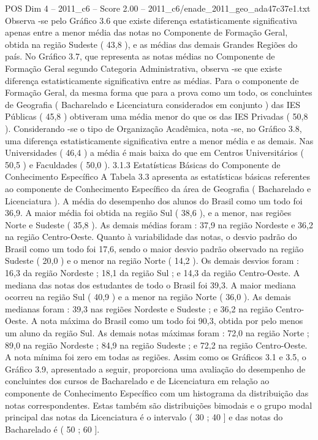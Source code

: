 \begin{textsample}{POS Dim 4 – 2011\_c6 – Score 2.00 – 2011\_c6/enade\_2011\_geo\_ada47c37e1.txt}
Observa -se pelo Gráfico 3.6 que existe diferença estatisticamente significativa apenas entre a menor média das notas no Componente de Formação Geral, obtida na região Sudeste ( 43,8 ), e as médias das demais Grandes Regiões do país.
No Gráfico 3.7, que representa as notas médias no Componente de Formação Geral segundo Categoria Administrativa, observa -se que existe diferença estatisticamente significativa entre as médias.
Para o componente de Formação Geral, da mesma forma que para a prova como um todo, os concluintes de Geografia ( Bacharelado e Licenciatura considerados em conjunto ) das IES Públicas ( 45,8 ) obtiveram uma média menor do que os das IES Privadas ( 50,8 ).
Considerando -se o tipo de Organização Acadêmica, nota -se, no Gráfico 3.8, uma diferença estatisticamente significativa entre a menor média e as demais.
Nas Universidades ( 46,4 ) a média é mais baixa do que em Centros Universitários ( 50,5 ) e Faculdades ( 50,0 ). 3.1.3 Estatísticas Básicas do Componente de Conhecimento Específico A Tabela 3.3 apresenta as estatísticas básicas referentes ao componente de Conhecimento Específico da área de Geografia ( Bacharelado e Licenciatura ).
A média do desempenho dos alunos do Brasil como um todo foi 36,9.
A maior média foi obtida na região Sul ( 38,6 ), e a menor, nas regiões Norte e Sudeste ( 35,8 ).
As demais médias foram : 37,9 na região Nordeste e 36,2 na região Centro-Oeste.
Quanto à variabilidade das notas, o desvio padrão do Brasil como um todo foi 17,6, sendo o maior desvio padrão observado na região Sudeste ( 20,0 ) e o menor na região Norte ( 14,2 ).
Os demais desvios foram : 16,3 da região Nordeste ; 18,1 da região Sul ; e 14,3 da região Centro-Oeste.
A mediana das notas dos estudantes de todo o Brasil foi 39,3.
A maior mediana ocorreu na região Sul ( 40,9 ) e a menor na região Norte ( 36,0 ).
As demais medianas foram : 39,3 nas regiões Nordeste e Sudeste ; e 36,2 na região Centro-Oeste.
A nota máxima do Brasil como um todo foi 90,3, obtida por pelo menos um aluno da região Sul.
As demais notas máximas foram : 72,0 na região Norte ; 89,0 na região Nordeste ; 84,9 na região Sudeste ; e 72,2 na região Centro-Oeste.
A nota mínima foi zero em todas as regiões.
Assim como os Gráficos 3.1 e 3.5, o Gráfico 3.9, apresentado a seguir, proporciona uma avaliação do desempenho de concluintes dos cursos de Bacharelado e de Licenciatura em relação ao componente de Conhecimento Específico com um histograma da distribuição das notas correspondentes.
Estas também são distribuições bimodais e o grupo modal principal das notas da Licenciatura é o intervalo ( 30 ; 40 ] e das notas do Bacharelado é ( 50 ; 60 ].

\end{textsample}
